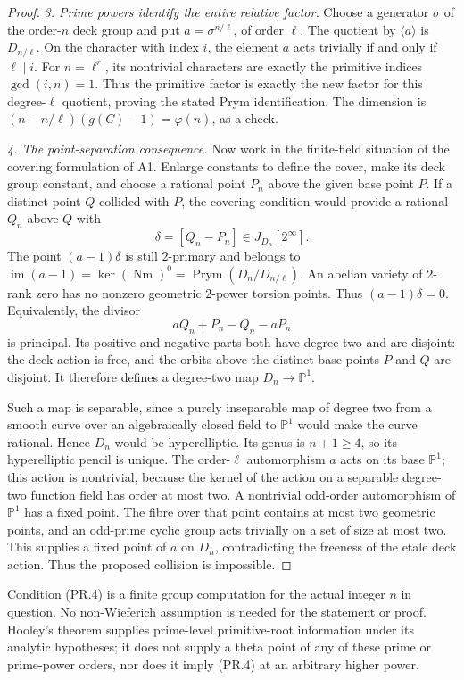 \documentclass[11pt,a4paper]{article}
\begin{document}
\begin{proof}
\emph{3. Prime powers identify the entire relative factor.}
Choose a generator $\sigma$ of the order-$n$ deck group and put
$a=\sigma^{n/\ell}$, of order $\ell$.
The quotient by $\langle a\rangle$ is $D_{n/\ell}$.
On the character with index $i$, the element $a$ acts trivially
if and only if $\ell\mid i$. For $n=\ell^r$, its nontrivial
characters are exactly the primitive indices $\gcd(i,n)=1$.
Thus the primitive factor is exactly the new factor for this
degree-$\ell$ quotient, proving the stated Prym identification.
The dimension is $(n-n/\ell)(g(C)-1)=\varphi(n)$, as a check.

\emph{4. The point-separation consequence.}
Now work in the finite-field situation of the covering formulation
of A1. Enlarge constants to define the cover, make its deck group
constant, and choose a rational point $P_n$ above the given base
point $P$. If a distinct point $Q$ collided with $P$, the covering
condition would provide a rational $Q_n$ above $Q$ with
\[
 \delta=[Q_n-P_n]\in J_{D_n}[2^\infty].
\]
The point $(a-1)\delta$ is still $2$-primary and belongs to
$\operatorname{im}(a-1)=\ker(\operatorname{Nm})^0
=\operatorname{Prym}(D_n/D_{n/\ell})$.
An abelian variety of $2$-rank zero has no nonzero geometric
$2$-power torsion points. Thus $(a-1)\delta=0$.
Equivalently, the divisor
\[
 aQ_n+P_n-Q_n-aP_n
 \tag{PR.8}
\]
is principal. Its positive and negative parts both have degree two
and are disjoint: the deck action is free, and the orbits above
the distinct base points $P$ and $Q$ are disjoint. It therefore
defines a degree-two map $D_n\to\mathbb P^1$.

Such a map is separable, since a purely inseparable map of degree
two from a smooth curve over an algebraically closed field to
$\mathbb P^1$ would make the curve rational. Hence $D_n$ would be
hyperelliptic. Its genus is $n+1\ge4$, so its hyperelliptic pencil
is unique. The order-$\ell$ automorphism $a$ acts on its base
$\mathbb P^1$; this action is nontrivial, because the kernel of
the action on a separable degree-two function field has order
at most two. A nontrivial odd-order automorphism of $\mathbb P^1$
has a fixed point. The fibre over that point contains at most two
geometric points, and an odd-prime cyclic group acts trivially on
a set of size at most two. This supplies a fixed point of $a$ on
$D_n$, contradicting the freeness of the etale deck action.
Thus the proposed collision is impossible.
\end{proof}

Condition (PR.4) is a finite group computation for the actual integer
$n$ in question. No non-Wieferich assumption is needed for the
statement or proof. Hooley's theorem supplies prime-level
primitive-root information under its analytic hypotheses; it does
not supply a theta point of any of these prime or prime-power
orders, nor does it imply (PR.4) at an arbitrary higher power.
\end{document}
